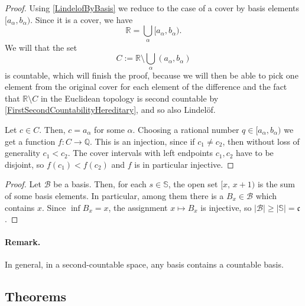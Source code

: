 \begin{proof}
    Using \ref{LindelofByBasis} we reduce to the case of a cover by basis elements \( [a_\alpha, b_\alpha) \). Since it is a cover, we have
    \[ 
        \mathbb{R} = \bigcup_{\alpha} [a_\alpha, b_\alpha).
   \]
   We will that the set
   \[ 
       C := \mathbb{R} \setminus \bigcup_{\alpha} (a_\alpha, b_\alpha) 
  \]
  is countable, which will finish the proof, because we will then be able to pick one element from the original cover for each element of the difference and the fact that \( \mathbb{R} \setminus C \) in the Euclidean topology is second countable by \ref{FirstSecondCountabilityHereditary}, and so also Lindel\"of.

  Let \( c \in C \). Then, \( c = a_\alpha \) for some \( \alpha \). Choosing a rational number \( q \in [a_\alpha, b_\alpha) \) we get a function \( f: C \to \mathbb{Q} \). This is an injection, since if \( c_1 \neq c_2 \), then without loss of generality \( c_1 < c_2 \). The cover intervals with left endpoints \( c_1, c_2 \) have to be disjoint, so \( f(c_1) < f(c_2) \) and \( f \) is in particular injective.
\end{proof}


\begin{proof}
    Let \( \mathcal{B} \) be a basis. Then, for each \( s \in \mathbb{S} \), the open set \( [x,\,x+1) \) is the sum of some basis elements. In particular, among them there is a \( B_x \in \mathcal{B} \) which contains \( x \). Since \( \inf B_x = x \), the assignment \( x \mapsto B_x \) is injective, so \( \left| \mathcal{B} \right| \geqslant \left| \mathbb{S} \right| = \mathfrak{c} \).
\end{proof}

\paragraph{Remark.} In general, in a second-countable space, any basis contains a countable basis.

\subsection{Theorems}


